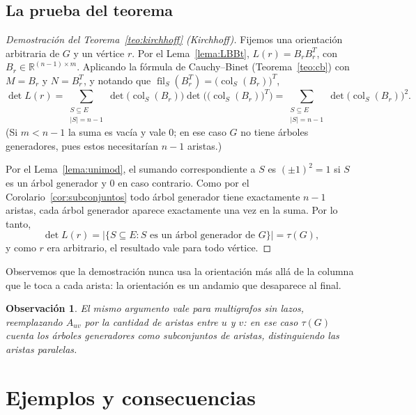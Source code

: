 \documentclass[12pt,a4paper]{article}
\theoremstyle{profesional}
\theoremstyle{definicion-style}
\theoremstyle{observacion-style}
\newtheorem{observacion}[teorema]{Observación}
\newcommand{\R}{\mathbb{R}}
\newcommand{\abs}[1]{\left| #1 \right|}
\newcommand{\colS}[2]{\operatorname{col}_{#2}(#1)}
\newcommand{\filS}[2]{\operatorname{fil}_{#2}(#1)}
\begin{document}
\subsection{La prueba del teorema}

\begin{proof}[Demostración del Teorema~\ref{teo:kirchhoff} (Kirchhoff)]
    Fijemos una orientación arbitraria de \( G \) y un vértice \( r \). Por el Lema~\ref{lema:LBBt}, \( L(r) = B_r B_r^{T} \), con \( B_r \in \R^{(n-1) \times m} \).
    Aplicando la fórmula de Cauchy--Binet (Teorema~\ref{teo:cb}) con \( M = B_r \) y \( N = B_r^{T} \), y notando que \( \filS{B_r^{T}}{S} = {\big(\colS{B_r}{S}\big)}^{T} \),
    \[
        \det L(r) = \sum_{\substack{S \subseteq E \\ \abs{S} = n - 1}} \det\big(\colS{B_r}{S}\big) \det\Big({\big(\colS{B_r}{S}\big)}^{T}\Big) = \sum_{\substack{S \subseteq E \\ \abs{S} = n - 1}} {\det\big(\colS{B_r}{S}\big)}^{2}.
    \]
    (Si \( m < n - 1 \) la suma es vacía y vale \( 0 \); en ese caso \( G \) no tiene árboles generadores, pues estos necesitarían \( n - 1 \) aristas.)

    Por el Lema~\ref{lema:unimod}, el sumando correspondiente a \( S \) es \( {(\pm 1)}^2 = 1 \) si \( S \) es un árbol generador y \( 0 \) en caso contrario. Como por el Corolario~\ref{cor:subconjuntos} todo árbol generador tiene exactamente \( n - 1 \) aristas, cada árbol generador aparece exactamente una vez en la suma. Por lo tanto,
    \[
        \det L(r) = \big| \{ S \subseteq E : S \text{ es un árbol generador de } G \} \big| = \tau(G),
    \]
    y como \( r \) era arbitrario, el resultado vale para todo vértice.
\end{proof}

Observemos que la demostración nunca usa la orientación más allá de la columna que le toca a cada arista: la orientación es un andamio que desaparece al final.

\begin{observacion}
    El mismo argumento vale para multigrafos sin lazos, reemplazando \( A_{uv} \) por la cantidad de aristas entre \( u \) y \( v \): en ese caso \( \tau(G) \) cuenta los árboles generadores como subconjuntos de aristas, distinguiendo las aristas paralelas.
\end{observacion}

\newpage
\section{Ejemplos y consecuencias}\label{sec:consecuencias}
\end{document}
